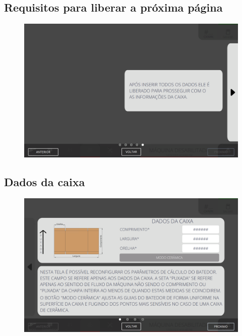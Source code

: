 \thispagestyle{fancy}
\vspace{\fill}
\subsection{\small Requisitos para liberar a próxima página}
\begin{figure}
    \centering
    \includegraphics[width=576 px,height=360 px]{src/imagesICV/09-request/new/e-5.png}
\end{figure}
\newpage

\thispagestyle{fancy}
\vspace{\fill}
\subsection{\small Dados da caixa}
\begin{figure}
    \centering
    \includegraphics[width=576 px,height=360 px]{src/imagesICV/09-request/new/e-6.png}
\end{figure}
\newpage

